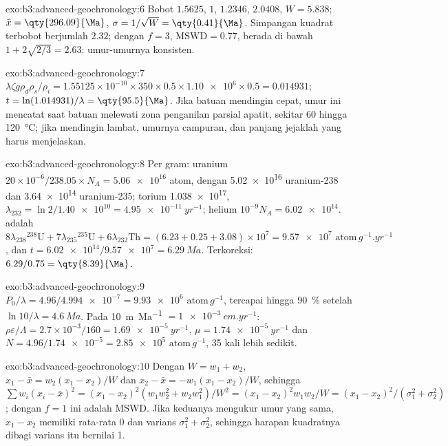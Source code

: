 \begin{solution}{exo:b3:advanced-geochronology:6}
Bobot $1.5625$, $1$, $1.2346$, $2.0408$, $W = 5.838$; $\bar x =
\qty{296.09}{\Ma}$, $\sigma = 1/\sqrt W = \qty{0.41}{\Ma}$. Simpangan kuadrat terbobot
berjumlah $2.32$; dengan $f = 3$, $\mathrm{MSWD} = 0.77$, berada di bawah
$1 + 2\sqrt{2/3} = 2.63$: umur-umurnya konsisten.
\end{solution}

\begin{solution}{exo:b3:advanced-geochronology:7}
$\lambda\zeta g\rho_d\rho_s/\rho_i = 1.55125\times10^{-10}\times350\times0.5
\times\num{1.10e6}\times0.5 = 0.014931$; $t = \ln(1.014931)/\lambda =
\qty{95.5}{\Ma}$. Jika batuan mendingin cepat, umur ini mencatat saat batuan melewati
zona penganilan parsial apatit, sekitar \qty{60}{} hingga \qty{120}{\celsius}; jika
mendingin lambat, umurnya campuran, dan panjang jejaklah yang harus menjelaskan.
\end{solution}

\begin{solution}{exo:b3:advanced-geochronology:8}
Per gram: uranium $20\times10^{-6}/238.05\times N_A = \num{5.06e16}$ atom, dengan
\num{5.02e16} uranium-238 dan \num{3.64e14} uranium-235; torium
\num{1.038e17}, $\lambda_{232} = \ln 2/\num{1.40e10} = \qty{4.95e-11}{yr^{-1}}$;
helium $10^{-9}N_A = \num{6.02e14}$.  adalah
$8\lambda_{238}{}^{238}\mathrm U + 7\lambda_{235}{}^{235}\mathrm U +
6\lambda_{232}\mathrm{Th} = (6.23 + 0.25 + 3.08)\times10^7 =
\num{9.57e7}\text{ atom}\,\unit{g^{-1}.yr^{-1}}$, dan $t = \num{6.02e14}/\num{9.57e7} =
\qty{6.29}{Ma}$. Terkoreksi: $6.29/0.75 = \qty{8.39}{\Ma}$.
\end{solution}

\begin{solution}{exo:b3:advanced-geochronology:9}
$P_0/\lambda = 4.96/\num{4.994e-7} = \num{9.93e6}\text{ atom}\,\unit{g^{-1}}$, tercapai hingga
\qty{90}{\percent} setelah $\ln 10/\lambda = \qty{4.6}{Ma}$. Pada
\qty{10}{m.Ma^{-1}} $= \qty{1e-3}{cm.yr^{-1}}$: $\rho\varepsilon/\Lambda =
2.7\times10^{-3}/160 = \qty{1.69e-5}{yr^{-1}}$, $\mu = \qty{1.74e-5}{yr^{-1}}$
dan $N = 4.96/\num{1.74e-5} = \num{2.85e5}\text{ atom}\,\unit{g^{-1}}$, 35 kali lebih sedikit.
\end{solution}

\begin{solution}{exo:b3:advanced-geochronology:10}
Dengan $W = w_1 + w_2$, $x_1 - \bar x = w_2(x_1 - x_2)/W$ dan $x_2 - \bar x =
-w_1(x_1 - x_2)/W$, sehingga $\sum w_i(x_i - \bar x)^2 = (x_1 - x_2)^2(w_1w_2^2 +
w_2w_1^2)/W^2 = (x_1 - x_2)^2w_1w_2/W = (x_1 - x_2)^2/(\sigma_1^2 +
\sigma_2^2)$; dengan $f = 1$ ini adalah MSWD. Jika keduanya mengukur umur yang sama,
$x_1 - x_2$ memiliki rata-rata 0 dan varians $\sigma_1^2 + \sigma_2^2$, sehingga
harapan kuadratnya dibagi varians itu bernilai 1.
\end{solution}

